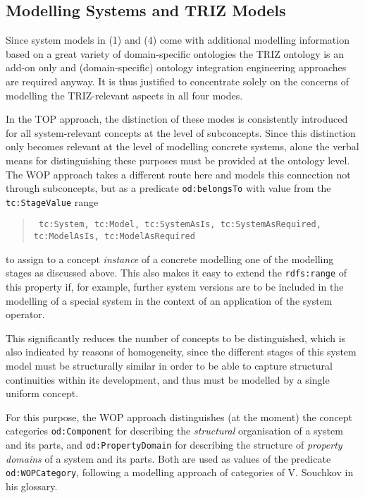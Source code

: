 \documentclass[11pt,a4paper]{article}
\begin{document}
\subsection{Modelling Systems and TRIZ Models}

Since system models in (1) and (4) come with additional modelling information
based on a great variety of domain-specific ontologies the TRIZ ontology is an
add-on only and (domain-specific) ontology integration engineering approaches
are required anyway. It is thus justified to concentrate solely on the
concerns of modelling the TRIZ-relevant aspects in all four modes.

In the TOP approach, the distinction of these modes is consistently introduced
for all system-relevant concepts at the level of subconcepts. Since this
distinction only becomes relevant at the level of modelling concrete systems,
alone the verbal means for distinguishing these purposes must be provided at
the ontology level. The WOP approach takes a different route here and models
this connection not through subconcepts, but as a predicate
\texttt{od:belongsTo} with value from the \texttt{tc:StageValue} range
\begin{quote}\tt
  tc:System, tc:Model, tc:SystemAsIs, tc:SystemAsRequired,\\ tc:ModelAsIs,
  tc:ModelAsRequired
\end{quote}
to assign to a concept \emph{instance} of a concrete modelling one of the
modelling stages as discussed above.  This also makes it easy to extend the
\texttt{rdfs:range} of this property if, for example, further system versions
are to be included in the modelling of a special system in the context of an
application of the system operator.

This significantly reduces the number of concepts to be distinguished, which
is also indicated by reasons of homogeneity, since the different stages of
this system model must be structurally similar in order to be able to capture
structural continuities within its development, and thus must be modelled by a
single uniform concept.

For this purpose, the WOP approach distinguishes (at the moment) the concept
categories \texttt{od:Component} for describing the \emph{structural}
organisation of a system and its parts, and \texttt{od:PropertyDomain} for
describing the structure of \emph{property domains} of a system and its
parts.  Both are used as values of the predicate \texttt{od:WOPCategory},
following a modelling approach of categories of V. Souchkov in his glossary. 
\end{document}
